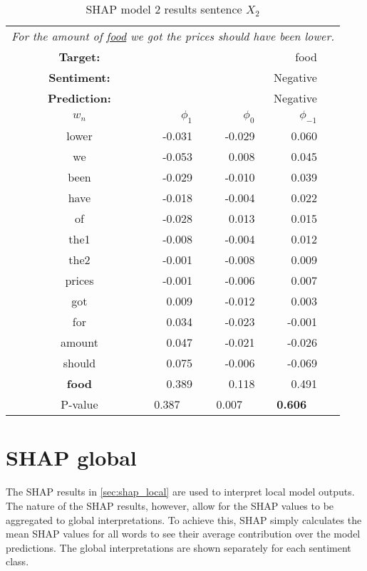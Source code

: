 \vspace{\baselineskip}
\begin{table}[ht]
\caption{SHAP model 2 results sentence $X_2$}
\centering
\begin{tabular}{p{15mm} c r r r c}
\multicolumn{6}{l}{{\textit{For the amount of \underline{food} we got the prices should have been lower.}}}\\
\cmidrule(lr){2-5}%
&\textbf{Target:}    &   \multicolumn{3}{r}{food}\\
&\textbf{Sentiment:} & \multicolumn{3}{r}{Negative}\\
&\textbf{Prediction:} & \multicolumn{3}{r}{Negative}\\
\cmidrule(lr){2-5}
&$w_n$           &   $\phi_1$    &   $\phi_0$    & $\phi_{-1}$\\
\cmidrule(lr){2-2}     \cmidrule(lr){3-5}%
&lower          &   -0.031  &   -0.029  &   0.060\\
&we             &   -0.053  &   0.008   &   0.045\\
&been           &   -0.029  &   -0.010  &   0.039\\
&have           &   -0.018  &   -0.004  &   0.022\\
&of             &   -0.028  &   0.013   &   0.015\\
&the1           &   -0.008  &   -0.004  &   0.012\\
&the2           &   -0.001  &   -0.008  &   0.009\\
&prices         &   -0.001  &   -0.006  &   0.007\\
&got            &   0.009   &   -0.012  &   0.003\\
&for            &   0.034   &   -0.023  &   -0.001\\
&amount         &   0.047   &   -0.021  &   -0.026\\
&should         &   0.075   &   -0.006  &   -0.069\\
&\textbf{food}  &   0.389   &   0.118   &   0.491\\
\cmidrule(lr){2-5}
&P-value & \multicolumn{1}{c}{0.387} & \multicolumn{1}{c}{0.007} & \multicolumn{1}{c}{\textbf{0.606}}
\end{tabular}
\label{tab:shap2_sen2}
\end{table}

\pagebreak
\section{SHAP global}
    \label{sec:shap_global}
The SHAP results in \ref{sec:shap_local} are used to interpret local model outputs. The nature of the SHAP results, however, allow for the SHAP values to be aggregated to global interpretations. To achieve this, SHAP simply calculates the mean SHAP values for all words to see their average contribution over the model predictions. The global interpretations are shown separately for each sentiment class. 

